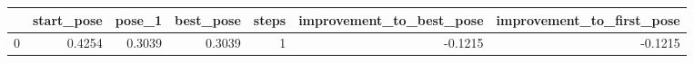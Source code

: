 \begin{tabular}{lrrrrrr}
\toprule
{} &  start\_pose &  pose\_1 &  best\_pose &  steps &  improvement\_to\_best\_pose &  improvement\_to\_first\_pose \\
\midrule
0 &      0.4254 &  0.3039 &     0.3039 &      1 &                   -0.1215 &                    -0.1215 \\
\bottomrule
\end{tabular}
